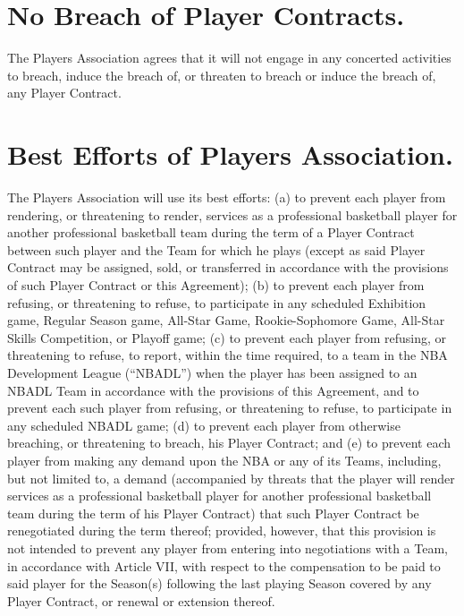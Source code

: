 \documentclass[
]{book}
\begin{document}
\hypertarget{no-breach-of-player-contracts.}{%
\section{No Breach of Player Contracts.}\label{no-breach-of-player-contracts.}}

The Players Association agrees that it will not engage in any concerted activities to breach, induce the breach of, or threaten to breach or induce the breach of, any Player Contract.

\hypertarget{best-efforts-of-players-association.}{%
\section{Best Efforts of Players Association.}\label{best-efforts-of-players-association.}}

The Players Association will use its best efforts: (a) to prevent each player from rendering, or threatening to render, services as a professional basketball player for another professional basketball team during the term of a Player Contract between such player and the Team for which he plays (except as said Player Contract may be assigned, sold, or transferred in accordance with the provisions of such Player Contract or this Agreement); (b) to prevent each player from refusing, or threatening to refuse, to participate in any scheduled Exhibition game, Regular Season game, All-Star Game, Rookie-Sophomore Game, All-Star Skills Competition, or Playoff game; (c) to prevent each player from refusing, or threatening to refuse, to report, within the time required, to a team in the NBA Development League (``NBADL'') when the player has been assigned to an NBADL Team in accordance with the provisions of this Agreement, and to prevent each such player from refusing, or threatening to refuse, to participate in any scheduled
NBADL game; (d) to prevent each player from otherwise breaching, or threatening to breach, his Player Contract; and (e) to prevent each player from making any demand upon the NBA or any of its Teams, including, but not limited to, a demand (accompanied by threats that the player will render services as a professional basketball player for another professional basketball team during the term of his Player Contract) that such Player Contract be renegotiated during the term thereof; provided, however, that this provision is not intended to prevent any player from entering into negotiations with a Team, in accordance with Article VII, with respect to the compensation to be paid to said player for the Season(s) following the last playing Season covered by any Player Contract, or renewal or extension thereof.
\end{document}
